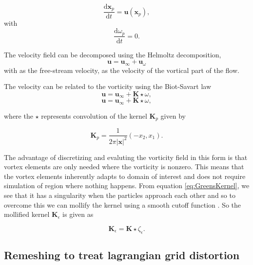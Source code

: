\begin{equation}
\frac{\mathrm{d}\mathbf{x}_p}{\mathrm{d}t} = \mathbf{u}\left(\mathbf{x}_p\right),
\end{equation}
with
\begin{equation}
\frac{\mathrm{d}\omega_p}{\mathrm{d}t} = 0.
\end{equation}

The velocity field can be decomposed using the Helmoltz decomposition,
\begin{equation}
\mathbf{u} = \mathbf{u}_{\infty} + \mathbf{u}_{\omega}
\end{equation}
with  as the free-stream velocity,  as the velocity of the vortical part of the flow.


The velocity can be related to the vorticity using the Biot-Savart law
\begin{equation}
\mathbf{u} = \mathbf{u}_{\infty} + \mathbf{K}\star\omega,
\end{equation}
\begin{equation}
\mathbf{u} = \mathbf{u}_{\infty} + \mathbf{K}\star\omega,
\end{equation}

where the $\star$ represents convolution of the kernel $\mathbf{K}_p$ given by

\begin{equation}
\mathbf{K}_p = \frac{1}{2\pi\left|\mathbf{x}\right|^2}\left(-x_2,x_1\right).
\label{eq:GreensKernel}
\end{equation}

The advantage of discretizing and evaluting the vorticity field in this form is that vortex elements are only needed where the vorticity is nonzero. This means that the vortex elements inherently adapts to domain of interest and does not require simulation of region where nothing happens. From equation \ref{eq:GreensKernel}, we see that it has a singularity when the particles approach each other and so to overcome this we can mollify the kernel using a smooth cutoff function . So the mollified kernel $\mathbf{K}_{\epsilon}$ is given as 

\begin{equation}
\mathbf{K}_{\epsilon} = \mathbf{K} \star \zeta_{\epsilon}.
\end{equation}

	\subsection{Remeshing to treat lagrangian grid distortion}

